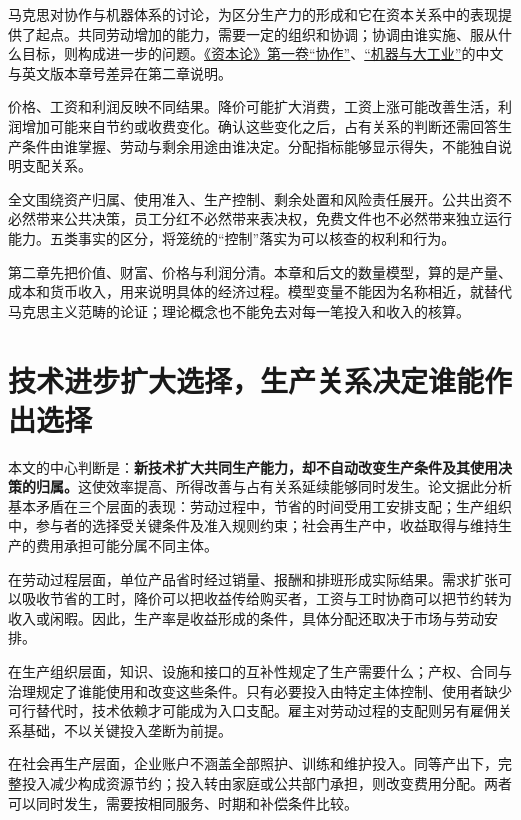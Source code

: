 \documentclass[UTF8,fontset=windows,12pt,a4paper,oneside,openany]{ctexbook}
\begin{document}
马克思对协作与机器体系的讨论，为区分生产力的形成和它在资本关系中的表现提供了起点。共同劳动增加的能力，需要一定的组织和协调；协调由谁实施、服从什么目标，则构成进一步的问题。\href{https://www.marxists.org/archive/marx/works/1867-c1/ch13.htm}{《资本论》第一卷“协作”}、\href{https://www.marxists.org/archive/marx/works/1867-c1/ch15.htm}{“机器与大工业”}的中文与英文版本章号差异在第二章说明。

价格、工资和利润反映不同结果。降价可能扩大消费，工资上涨可能改善生活，利润增加可能来自节约或收费变化。确认这些变化之后，占有关系的判断还需回答生产条件由谁掌握、劳动与剩余用途由谁决定。分配指标能够显示得失，不能独自说明支配关系。

全文围绕资产归属、使用准入、生产控制、剩余处置和风险责任展开。公共出资不必然带来公共决策，员工分红不必然带来表决权，免费文件也不必然带来独立运行能力。五类事实的区分，将笼统的“控制”落实为可以核查的权利和行为。

第二章先把价值、财富、价格与利润分清。本章和后文的数量模型，算的是产量、成本和货币收入，用来说明具体的经济过程。模型变量不能因为名称相近，就替代马克思主义范畴的论证；理论概念也不能免去对每一笔投入和收入的核算。

\section{技术进步扩大选择，生产关系决定谁能作出选择}

本文的中心判断是：\textbf{新技术扩大共同生产能力，却不自动改变生产条件及其使用决策的归属。}这使效率提高、所得改善与占有关系延续能够同时发生。论文据此分析基本矛盾在三个层面的表现：劳动过程中，节省的时间受用工安排支配；生产组织中，参与者的选择受关键条件及准入规则约束；社会再生产中，收益取得与维持生产的费用承担可能分属不同主体。

在劳动过程层面，单位产品省时经过销量、报酬和排班形成实际结果。需求扩张可以吸收节省的工时，降价可以把收益传给购买者，工资与工时协商可以把节约转为收入或闲暇。因此，生产率是收益形成的条件，具体分配还取决于市场与劳动安排。

在生产组织层面，知识、设施和接口的互补性规定了生产需要什么；产权、合同与治理规定了谁能使用和改变这些条件。只有必要投入由特定主体控制、使用者缺少可行替代时，技术依赖才可能成为入口支配。雇主对劳动过程的支配则另有雇佣关系基础，不以关键投入垄断为前提。

在社会再生产层面，企业账户不涵盖全部照护、训练和维护投入。同等产出下，完整投入减少构成资源节约；投入转由家庭或公共部门承担，则改变费用分配。两者可以同时发生，需要按相同服务、时期和补偿条件比较。
\end{document}
